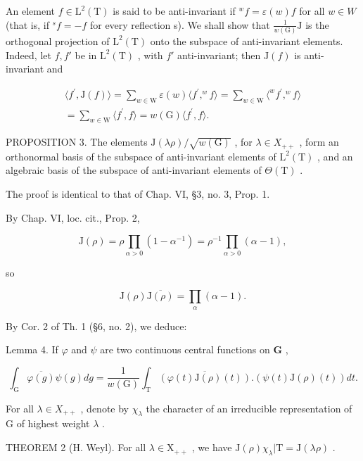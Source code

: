 An element \(f \in \mathrm{L}^{2}(\mathrm{T})\) is said to be anti-invariant if \(^{w}f = \varepsilon(w)f\) for all \(w \in W\) (that is, if \(^{s}f = -f\) for every reflection s). We shall show that \(\frac{1}{w(\mathrm{G})}\mathrm{J}\) is the orthogonal projection of \(\mathrm{L}^{2}(\mathrm{T})\) onto the subspace of anti-invariant elements. Indeed, let \(f, f'\) be in \(\mathrm{L}^{2}(\mathrm{T})\) , with \(f'\) anti-invariant; then \(\mathrm{J}(f)\) is anti-invariant and

\[
\begin{array}{c} \langle f ^ {\prime}, \mathrm{J} (f) \rangle = \sum_ {w \in \mathrm{W}} \varepsilon (w) \langle f ^ {\prime},   ^ {w} f \rangle = \sum_ {w \in \mathrm{W}} \langle^ {w} f ^ {\prime},   ^ {w} f \rangle \\ = \sum_ {w \in \mathrm{W}} \langle f ^ {\prime},   f \rangle = w (\mathrm{G}) \langle f ^ {\prime},   f \rangle . \end{array}
\]

PROPOSITION 3. The elements \(\mathrm{J}(\lambda\rho)/\sqrt{w(\mathrm{G})}\) , for \(\lambda\in X_{++}\) , form an orthonormal basis of the subspace of anti-invariant elements of \(\mathrm{L}^{2}(\mathrm{T})\) , and an algebraic basis of the subspace of anti-invariant elements of \(\Theta(\mathrm{T})\) .

The proof is identical to that of Chap. VI, §3, no. 3, Prop. 1.

By Chap. VI, loc. cit., Prop. 2,

\[
\mathrm{J} (\rho) = \rho \prod_ {\alpha > 0} (1 - \alpha^ {- 1}) = \rho^ {- 1} \prod_ {\alpha > 0} (\alpha - 1),\tag{3}
\]

so

\[
\mathrm{J} (\rho) \overline {{\mathrm{J} (\rho)}} = \prod_ {\alpha} (\alpha - 1).\tag{4}
\]

By Cor. 2 of Th. 1 (§6, no. 2), we deduce:

Lemma 4. If \(\varphi\) and \(\psi\) are two continuous central functions on \(\mathbf{G}\) ,

\[
\int_ {\mathrm{G}} \overline {{\varphi (g)}} \psi (g) d g = \frac {1}{w (\mathrm{G})} \int_ {\mathrm{T}} \overline {{(\varphi (t) \mathrm{J} (\rho) (t))}}. (\psi (t) \mathrm{J} (\rho) (t)) d t.
\]

For all \(\lambda\in X_{++}\) , denote by \(\chi_{\lambda}\) the character of an irreducible representation of G of highest weight \(\lambda\) .

THEOREM 2 (H. Weyl). For all \(\lambda \in \mathrm{X}_{++}\) , we have \(\mathrm{J}(\rho)\chi_{\lambda}|\mathrm{T} = \mathrm{J}(\lambda \rho)\) .

